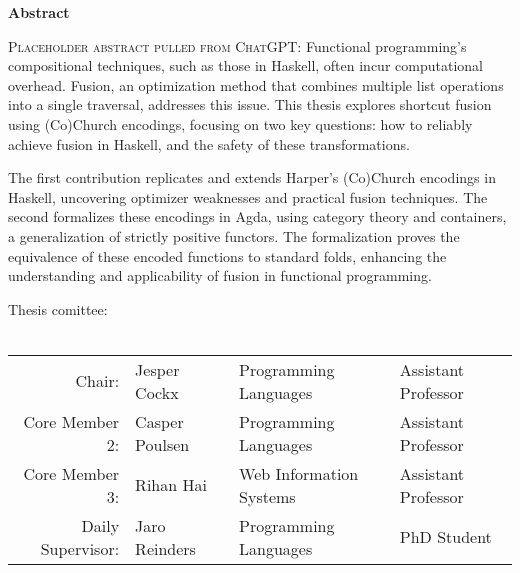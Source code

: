 \thispagestyle{plain}
\begin{center}
    \Large
    \textbf{\thetitle}
        
    \vspace{0.4cm}
    \large
    \thesubtitle
        
    \vspace{0.4cm}
    \textbf{\thename}
       
    \vspace{1.9cm}
    \textbf{Abstract}
\end{center}
\begin{adjustwidth}{2cm}{2cm}
\textsc{Placeholder abstract pulled from ChatGPT:}
Functional programming's compositional techniques, such as those in Haskell, often incur computational overhead.
Fusion, an optimization method that combines multiple list operations into a single traversal, addresses this issue.
This thesis explores shortcut fusion using (Co)Church encodings, focusing on two key questions: how to reliably achieve fusion in Haskell, and the safety of these transformations.

The first contribution replicates and extends Harper's (Co)Church encodings in Haskell, uncovering optimizer weaknesses and practical fusion techniques.
The second formalizes these encodings in Agda, using category theory and containers, a generalization of strictly positive functors.
The formalization proves the equivalence of these encoded functions to standard folds, enhancing the understanding and applicability of fusion in functional programming.
\end{adjustwidth}

\vfill 

\begin{center}
    Thesis comittee:\\~\\
    \begin{tabular}{r l l l}
        Chair: & Jesper Cockx & Programming Languages & Assistant Professor \\
        Core Member 2: & Casper Poulsen & Programming Languages & Assistant Professor \\
        Core Member 3: & Rihan Hai & Web Information Systems & Assistant Professor \\
        Daily Supervisor: & Jaro Reinders & Programming Languages & PhD Student 
    \end{tabular}
\end{center}
\vspace{1cm}
\pagebreak